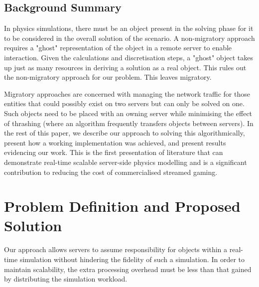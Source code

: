 \section{Background Summary}
In physics simulations, there must be an object present in the solving phase for it to be considered in the overall solution of the scenario. A non-migratory approach requires a "ghost" representation of the object in a remote server to enable interaction. Given the calculations and discretisation steps, a "ghost" object takes up just as many resources in deriving a solution as a real object. This rules out the non-migratory approach for our problem. This leaves migratory.

Migratory approaches are concerned with managing the network traffic for those entities that could possibly exist on two servers but can only be solved on one. Such objects need to be placed with an owning server while minimising the effect of thrashing (where an algorithm frequently transfers objects between servers). In the rest of this paper, we describe our approach to solving this algorithmically, present how a working implementation was achieved, and present results evidencing our work. This is the first presentation of literature that can demonstrate real-time scalable server-side physics modelling and is a significant contribution to reducing the cost of commercialised streamed gaming.

\chapter{Problem Definition and Proposed Solution}
Our approach allows servers to assume responsibility for objects within a real-time simulation without hindering the fidelity of such a simulation. In order to maintain scalability, the extra processing overhead must be less than that gained by distributing the simulation workload. 
	
